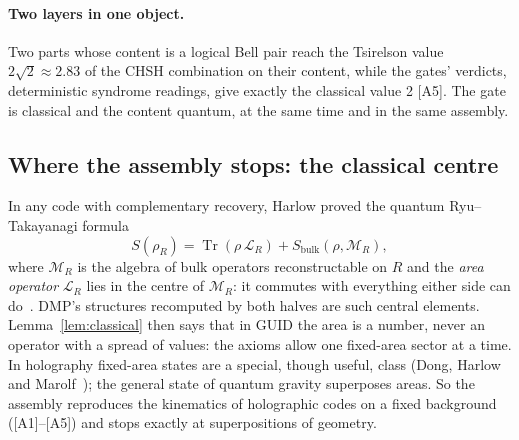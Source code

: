 \documentclass[11pt,a4paper]{article}
\theoremstyle{definition}
\theoremstyle{remark}
\newcommand{\chk}[1]{\textsf{[#1]}}
\newcommand{\Tr}{\operatorname{Tr}}
\theoremstyle{definition}
\begin{document}
\paragraph{Two layers in one object.} Two parts whose content is a logical Bell pair reach the Tsirelson value $2\sqrt2\approx2.83$ of the
CHSH combination on their content, while the gates' verdicts, deterministic syndrome readings, give exactly the classical value 2
\chk{A5}. The gate is classical and the content quantum, at the same time and in the same assembly.

\subsection{Where the assembly stops: the classical centre}

In any code with complementary recovery, Harlow proved the quantum Ryu--Takayanagi formula
\begin{equation}\label{eq:harlow}
S(\rho_R)=\Tr(\rho\,\mathcal L_R)+S_{\text{bulk}}(\rho,\mathcal M_R),
\end{equation}
where $\mathcal M_R$ is the algebra of bulk operators reconstructable on $R$ and the \emph{area operator} $\mathcal L_R$ lies in the centre of
$\mathcal M_R$: it commutes with everything either side can do~\cite{harlow}. DMP's structures recomputed by both halves are such central
elements. Lemma~\ref{lem:classical} then says that in GUID the area is a number, never an operator with a spread of values: the axioms
allow one fixed-area sector at a time. In holography fixed-area states are a special, though useful, class (Dong, Harlow and
Marolf~\cite{dhm}); the general state of quantum gravity superposes areas. So the assembly reproduces the kinematics of holographic codes on
a fixed background (\chk{A1}--\chk{A5}) and stops exactly at superpositions of geometry.
\end{document}
